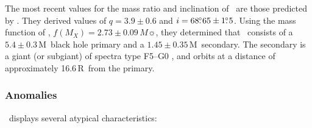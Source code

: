 \vspace{\myparskip}

The most recent values for the mass ratio and
inclination of \groj\ are those predicted by %
. They derived values of $q=3.9\pm0.6$ and $i=68 \hbox{$.\!\!^\circ$} 65 \pm
1 \hbox{$.\!\!^\circ$} 5$. Using the mass function of , %
$f(M_X) = 2.73\pm0.09\,M\sun$, they determined that
\groj\ consists of a $5.4\pm0.3$\,M\sun\ black hole primary and a
$1.45\pm0.35$\,M\sun\ secondary. The secondary is a giant (or subgiant) of spectra type F5--G0%
, and orbits at a distance of approximately 16.6\,R\sun\ from the primary. %


\subsubsection{Anomalies}
\label{cha:GROJ1655-40:sec:IntroductionToJ1655:subsec:PropertiesOfJ1655:subsubsec:Eccentricities}

\groj\ displays several atypical characteristics:

